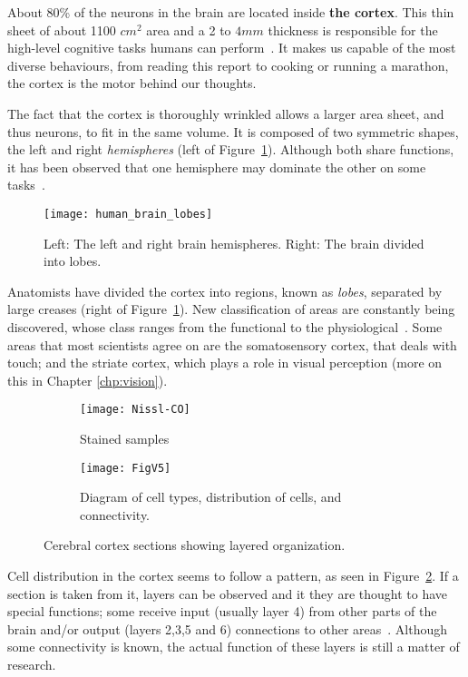 About 80\% of the neurons in the brain are located inside \textbf{the cortex}. This thin sheet of about 1100 $cm^2$ area and a 2 to $4 mm$ thickness is responsible for the high-level cognitive tasks humans can perform~\cite{thompson2000brain}. It makes us capable of the most diverse behaviours, from reading this report to cooking or running a marathon, the cortex is the motor behind our thoughts. 

The fact that the cortex is thoroughly wrinkled allows a larger area sheet, and thus neurons, to fit in the same volume. It is composed of two symmetric shapes, the left and right \emph{hemispheres} (left of Figure~\ref{fig:brain:hemi-lobes}). Although both share functions, it has been observed that one hemisphere may dominate the other on some tasks~\cite{lateralization}. 

\begin{figure}[hbt]
  \begin{center}
    \texttt{[image: human\_brain\_lobes]}
    \caption{Left: The left and right brain hemispheres. Right: The brain divided into lobes.}
    \label{fig:brain:hemi-lobes}
  \end{center}
\end{figure}

Anatomists have divided the cortex into regions, known as \emph{lobes},  separated by large creases (right of Figure~\ref{fig:brain:hemi-lobes}). New classification of areas are constantly being discovered, whose class ranges from the functional to the physiological~\cite{eye-brain-vision-hubel1995}. Some areas that most scientists agree on are the somatosensory cortex, that deals with touch; and the striate cortex, which plays a role in visual perception (more on this in Chapter \ref{chp:vision}).

\begin{figure}[ht]
  \begin{center}
    \begin{subfigure}{0.4\textwidth}
      \texttt{[image: Nissl-CO]}
      \caption{Stained samples}
    \end{subfigure}
    \begin{subfigure}{0.4\textwidth}
      \texttt{[image: FigV5]}
      \caption{Diagram of cell types, distribution of cells, and connectivity.}
    \end{subfigure}
    \caption{Cerebral cortex sections showing layered organization.}
    \label{fig:neuro:cortex-layers}
  \end{center}
\end{figure}

Cell distribution in the cortex seems to follow a pattern, as seen in Figure~\ref{fig:neuro:cortex-layers}. If a section is taken from it,  layers can be observed and it they are thought to have special functions; some  receive input (usually layer 4) from other parts of the brain and/or output (layers 2,3,5 and 6) connections to other areas~\cite{thompson2000brain,eye-brain-vision-hubel1995}. Although some connectivity is known, the actual function of these layers is still a matter of research.